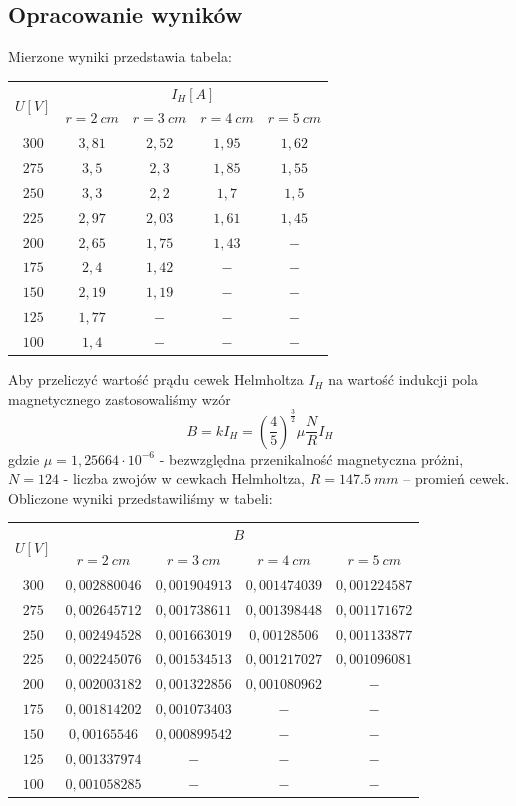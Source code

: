\documentclass{article}
\begin{document}
\subsection{Opracowanie wyników}
Mierzone wyniki przedstawia tabela:
\begin{center}
\begin{tabular}{|c|c|c|c|c|}
\hline
\multirow{2}{*}{$U[V]$} & \multicolumn{4}{|c|}{$I_H[A]$}\\  
 & $r = 2\ cm$ & $r = 3\ cm$ & $r = 4\ cm$ & $r = 5\ cm$ \\ \hline  
$300$ & $3,81$ & $2,52$ & $1,95$ & $1,62$ \\ \hline 
$275$ & $3,5$ & $2,3$ & $1,85$ & $1,55$\\ \hline 
$250$ & $3,3$ & $2,2$ & $1,7$ & $1,5$\\ \hline 
$225$ & $2,97$ & $2,03$ & $1,61$ & $1,45$\\ \hline 
$200$ & $2,65$ & $1,75$ & $1,43$ & $-$\\ \hline 
$175$ & $2,4$ & $1,42$ & $-$ & $-$\\ \hline 
$150$ & $2,19$ & $1,19$ & $-$ & $-$\\\hline 
$125$ & $1,77$ & $-$ & $-$ & $-$\\ \hline 
$100$ & $1,4$ & $-$ & $-$ & $-$\\ \hline 
\end{tabular}
\end{center}
Aby przeliczyć wartość prądu cewek Helmholtza $I_H$ na wartość indukcji pola magnetycznego zastosowaliśmy wzór 
$$B = kI_H = \left(\frac{4}{5}\right)^{\frac{3}{2}} \mu \frac{N}{R} I_H$$
gdzie $\mu = 1,25664 \cdot 10^{-6}$ - bezwzględna  przenikalność  magnetyczna  próżni, $N = 124$ -  liczba  zwojów  w  cewkach Helmholtza, $R = 147.5\ mm$ – promień cewek.\\
Obliczone wyniki przedstawiliśmy w tabeli:
\begin{center}
\begin{tabular}{|c|c|c|c|c|}
\hline
\multirow{2}{*}{$U[V]$} & \multicolumn{4}{|c|}{$B$}\\  
 & $r = 2\ cm$ & $r = 3\ cm$ & $r = 4\ cm$ & $r = 5\ cm$ \\ \hline 
$300$ & $0,002880046$ & $0,001904913$ & $0,001474039$ & $0,001224587$\\ \hline 
$275$ & $0,002645712$ & $0,001738611$ & $0,001398448$ & $0,001171672$\\ \hline 
$250$ & $0,002494528$ & $0,001663019$ & $0,00128506$ & $0,001133877$\\ \hline 
$225$ & $0,002245076$ & $0,001534513$ & $0,001217027$ & $0,001096081$\\ \hline 
$200$ & $0,002003182$ & $0,001322856$ & $0,001080962$ & $-$\\ \hline 
$175$ & $0,001814202$ & $0,001073403$ & $-$ & $-$\\ \hline 
$150$ & $0,00165546$ & $0,000899542$ & $-$ & $-$\\ \hline 
$125$ & $0,001337974$ & $-$ & $-$ & $-$\\ \hline 
$100$ & $0,001058285$ & $-$ & $-$ & $-$\\ \hline 
\end{tabular}
\end{center}
\end{document}
